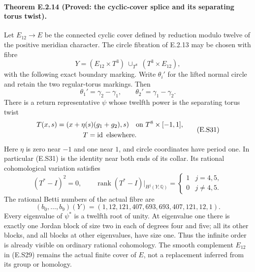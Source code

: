\paragraph{Theorem E.2.14 (Proved: the cyclic-cover splice and its separating torus twist).}
Let $E_{12}\to E$ be the connected cyclic cover defined by
reduction modulo twelve of the positive meridian character.
The circle fibration of E.2.13 may be chosen with fibre
\[
 Y=(E_{12}\times T^3)\ \cup_{T^8}\ (T^3\times E_{12}),
 \tag{E.S29}
\]
with the following exact boundary marking. Write
$\theta_i'$ for the lifted normal circle and retain the
two regular-torus markings. Then
\[
       \theta_1'=\gamma_2-\gamma_1,\qquad
       \theta_2'=\gamma_1-\gamma_2.
 \tag{E.S30}
\]
There is a return representative $\psi$ whose twelfth power
is the separating torus twist
\[
 \begin{gathered}
 T(x,s)=(x+\eta(s)(g_1+g_2),s)\quad\hbox{on }T^8\times[-1,1],
 \\
 T=\operatorname{id}\text{ elsewhere}.
 \end{gathered}
 \tag{E.S31}
\]
Here $\eta$ is zero near $-1$ and one near $1$, and circle
coordinates have period one. In particular (E.S31) is the
identity near both ends of its collar. Its rational
cohomological variation satisfies
\[
 (T^*-I)^2=0,\qquad
 \operatorname{rank}(T^*-I)|_{H^j(Y;\mathbb Q)}=
 \begin{cases}1&j=4,5,\\0&j\ne4,5.\end{cases}
 \tag{E.S32}
\]
The rational Betti numbers of the actual fibre are
\[
       (b_0,\ldots,b_9)(Y)
          =(1,12,121,407,693,693,407,121,12,1).
 \tag{E.S33}
\]
Every eigenvalue of $\psi^*$ is a twelfth root of unity.
At eigenvalue one there is exactly one Jordan block of
size two in each of degrees four and five; all its other
blocks, and all blocks at other eigenvalues, have size one.
Thus the infinite order is already visible on ordinary
rational cohomology. The smooth complement $E_{12}$ in
(E.S29) remains the actual finite cover of $E$, not a
replacement inferred from its group or homology.

